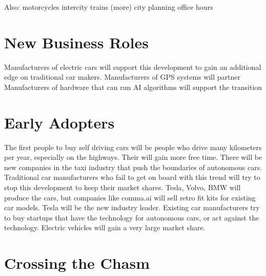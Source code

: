 \documentclass[a4paper]{article}
\begin{document}
Also:
motorcycles
intercity trains (more)
city planning
office hours

\section{New Business Roles}
\label{sec:new-business-roles}

Manufacturers of electric cars will support this development to gain an additional edge on traditional car makers.
Manufacturers of GPS systems will partner
Manufacturers of hardware that can run AI algorithms will support the transition

\section{Early Adopters}
\label{sec:early-adopters}

The first people to buy self driving cars will be people who drive many kilometers per year, especially on the highways. Their will gain more free time.
There will be new companies in the taxi industry that push the boundaries of autonomous cars.
Traditional car manufacturers who fail to get on board with this trend will try to stop this development to keep their market shares.
Tesla, Volvo, BMW will produce the cars, but companies like comma.ai will sell retro fit kits for existing car models.
Tesla will be the new industry leader.
Existing car manufacturers try to buy startups that have the technology for autonomous cars, or act against the technology.
Electric vehicles will gain a very large market share.

\section{Crossing the Chasm}
\label{sec:crossing-the-chasm}



\end{document}
